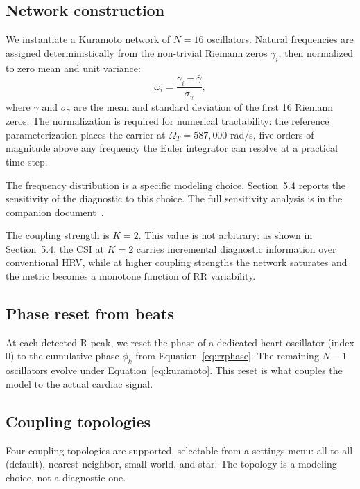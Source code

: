 \documentclass[11pt]{article}
\begin{document}
\subsection{Network construction}

We instantiate a Kuramoto network of $N = 16$ oscillators. Natural
frequencies are assigned deterministically from the non-trivial
Riemann zeros $\gamma_i$, then normalized to zero mean and unit
variance:
\begin{equation}
\omega_i = \frac{\gamma_i - \bar\gamma}{\sigma_\gamma},
\label{eq:freqnorm}
\end{equation}
where $\bar\gamma$ and $\sigma_\gamma$ are the mean and standard
deviation of the first 16 Riemann zeros. The normalization is required
for numerical tractability: the reference parameterization places the
carrier at $\Omega_T = 587{,}000$ rad/s, five orders of magnitude above
any frequency the Euler integrator can resolve at a practical time
step.

The frequency distribution is a specific modeling choice. Section~5.4
reports the sensitivity of the diagnostic to this choice. The full
sensitivity analysis is in the companion document~\cite{simoes2026sensitivity}.

The coupling strength is $K = 2$. This value is not arbitrary: as
shown in Section~5.4, the CSI at $K = 2$ carries incremental diagnostic
information over conventional HRV, while at higher coupling strengths
the network saturates and the metric becomes a monotone function of RR
variability.

\subsection{Phase reset from beats}

At each detected R-peak, we reset the phase of a dedicated heart
oscillator (index 0) to the cumulative phase $\phi_k$ from
Equation~\ref{eq:rrphase}. The remaining $N-1$ oscillators evolve under
Equation~\ref{eq:kuramoto}. This reset is what couples the model to
the actual cardiac signal.

\subsection{Coupling topologies}

Four coupling topologies are supported, selectable from a settings
menu: all-to-all (default), nearest-neighbor, small-world, and star.
The topology is a modeling choice, not a diagnostic one.
\end{document}
